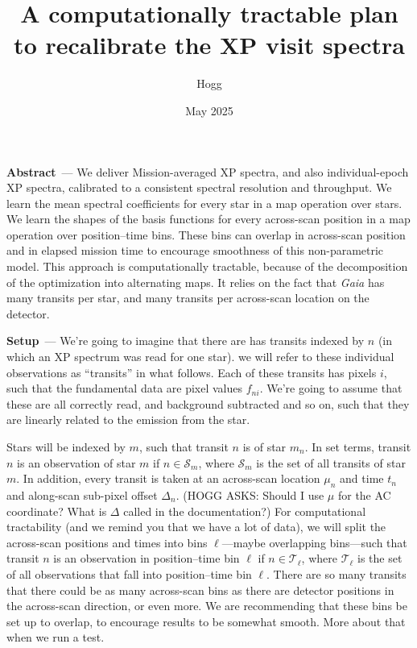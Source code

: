 \documentclass{article}
\title{\bfseries A computationally tractable plan to recalibrate the XP visit spectra}
\author{Hogg}
\date{May 2025}
\renewcommand{\paragraph}[1]{\bigskip\par\noindent\textbf{#1}~---}
\newcommand{\set}[1]{\mathscr{#1}}
\begin{document}
\maketitle

\paragraph{Abstract}
We deliver Mission-averaged XP spectra, and also individual-epoch XP spectra, calibrated to a consistent spectral resolution and throughput.
We learn the mean spectral coefficients for every star in a map operation over stars.
We learn the shapes of the basis functions for every across-scan position in a map operation over position--time bins.
These bins can overlap in across-scan position and in elapsed mission time to encourage smoothness of this non-parametric model.
This approach is computationally tractable, because of the decomposition of the optimization into alternating maps.
It relies on the fact that \textsl{Gaia} has many transits per star, and many transits per across-scan location on the detector.

\paragraph{Setup}
We're going to imagine that there are has transits indexed by $n$ (in which an XP spectrum was read for one star).
we will refer to these individual observations as ``transits'' in what follows.
Each of these transits has pixels $i$, such that the fundamental data are pixel values $f_{ni}$.
We're going to assume that these are all correctly read, and background subtracted and so on, such that they are linearly related to the emission from the star.

Stars will be indexed by $m$, such that transit $n$ is of star $m_n$.
In set terms, transit $n$ is an observation of star $m$ if $n\in\set{S}_m$, where $\set{S}_m$ is the set of all transits of star $m$.
In addition, every transit is taken at an across-scan location $\mu_n$ and time $t_n$ and along-scan sub-pixel offset $\Delta_n$.
(HOGG ASKS: Should I use $\mu$ for the AC coordinate? What is $\Delta$ called in the documentation?)
For computational tractability (and we remind you that we have a lot of data), we will split the across-scan positions and times into bins $\ell$---maybe overlapping bins---such that transit $n$ is an observation in position--time bin $\ell$ if $n\in\set{T}_\ell$, where $\set{T}_\ell$ is the set of all observations that fall into position--time bin $\ell$.
There are so many transits that there could be as many across-scan bins as there are detector positions in the across-scan direction, or even more.
We are recommending that these bins be set up to overlap, to encourage results to be somewhat smooth.
More about that when we run a test.
\end{document}
